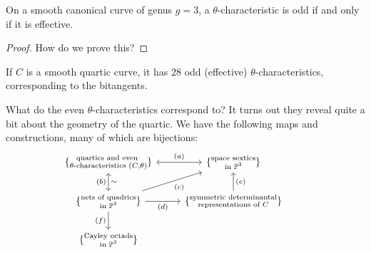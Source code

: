 \documentclass[11pt]{amsart}
\begin{document}
\begin{proposition} On a smooth canonical curve of genus $g=3$, a $\theta$-characteristic is odd if and only if it is effective.
\end{proposition}
\begin{proof} How do we prove this?
\end{proof}


\begin{example} If $C$ is a smooth quartic curve, it has $28$ odd (effective) $\theta$-characteristics, corresponding to the bitangents.
\end{example}

What do the even $\theta$-characteristics correspond to? It turns out they reveal quite a bit about the geometry of the quartic. We have the following maps and constructions, many of which are bijections:
\[ \begin{tikzcd}
    {\{\substack{\text{quartics and even } \\\theta\text{-characteristics }(C,\theta) }\}}\dar[<->,"\sim" right,"(b)" left]\rar[<->,"(a)"] & {\{\substack{\text{space sextics} \\ \text{in } \P^3}\}} & \\
    {\{\substack{\text{nets of quadrics}\\\text{in }\P^3}\}} \rar["(d)" below]\ar[ur,"(c)" below right]\dar["(f)" left] & {\{\substack{\text{symmetric determinantal}\\\text{representations of }C}\}}\uar["(e)" right] \\
    {\{\substack{\text{Cayley octads} \\ \text{in }\P^3}\}}
\end{tikzcd} \]
\end{document}
